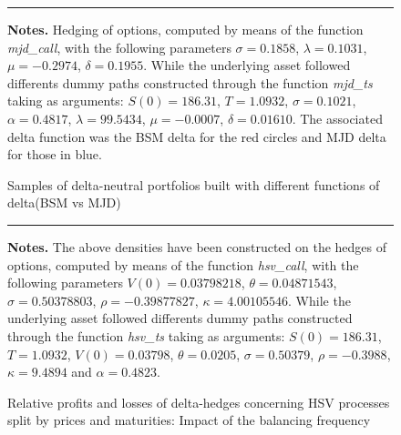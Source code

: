 \documentclass[12pt]{report}
\begin{document}
\begin{appendices}


\begin{figure}[h]
  \centering
  \rule{40mm}{20mm}
  \caption{Samples of delta-neutral portfolios built with different functions of delta(BSM vs MJD)}
  \begin{changemargin}{0.5cm}{0.5cm}
  \medskip
\footnotesize
{}\textbf{Notes.} Hedging of options, computed by means of the function \textit{mjd\_call}, with the following parameters $\sigma = 0.1858$, $\lambda = 0.1031$, $\mu = -0.2974$, $\delta = 0.1955$. While the underlying asset followed differents dummy paths constructed through the function \textit{mjd\_ts} taking as arguments: $S(0) = 186.31$, $T = 1.0932$, $\sigma = 0.1021$, $\alpha = 0.4817$, $\lambda = 99.5434$, $\mu = -0.0007$, $\delta = 0.01610$. The associated delta function was the BSM delta for the red circles and MJD delta for those in blue.
  \end{changemargin}
  \label{p:analysis:mjd:hedge:deltas}
\end{figure}






\begin{figure}[h]
  \centering
  \rule{40mm}{20mm}
  \caption{Relative profits and losses of delta-hedges concerning HSV processes split by prices and maturities: Impact of the balancing frequency}
  \begin{changemargin}{0.5cm}{0.5cm}
  \medskip
\footnotesize
{}\textbf{Notes.} The above densities have been constructed on the hedges of options, computed by means of the function \textit{hsv\_call}, with the following parameters $V(0) = 0.03798218$, $\theta = 0.04871543$, $\sigma = 0.50378803$, $\rho = -0.39877827$, $\kappa = 4.00105546$. While the underlying asset followed differents dummy paths constructed through the function \textit{hsv\_ts} taking as arguments: $S(0) = 186.31$, $T = 1.0932$, $V(0) = 0.03798$, $\theta = 0.0205$, $\sigma = 0.50379$, $\rho = -0.3988$,  $\kappa = 9.4894$ and $\alpha  = 0.4823$. 
  \end{changemargin}
  \label{p:analysis:hsv:pl:dist:big}
\end{figure}







\end{appendices}
\end{document}
